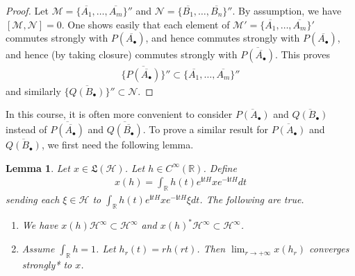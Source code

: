 \documentclass[12pt,b5paper,notitlepage]{article}
\theoremstyle{definition}
\theoremstyle{plain}
\newtheorem{lm}[df]{Lemma}
\newcommand{\fk}{\mathfrak}
\newcommand{\mc}{\mathcal}
\newcommand{\ovl}{\overline}
\newcommand{\im}{\mathbf{i}}
\newcommand{\blt}{\bullet}
\newcommand{\Rbb}{\mathbb R}
\newcommand{\dps}{\displaystyle}
\numberwithin{equation}{section}
\begin{document}

\begin{proof}
Let $\mc M=\{\ovl{A_1},\dots,\ovl{A_m}\}''$ and $\mc N=\{\ovl{B_1},\dots,\ovl{B_n}\}''$. By assumption, we have $[\mc M,\mc N]=0$. One shows easily that each element of $\mc M'=\{\ovl{A_1},\dots,\ovl{A_m}\}'$ commutes strongly with $P(\ovl{A_\blt})$, and hence commutes strongly with $P(\ovl{A_\blt})$, and hence (by taking closure) commutes strongly with $\ovl{P(\ovl{A_\blt})}$. This proves
\begin{align}
\{\ovl{P(\ovl{A_\blt})}\}''\subset\{\ovl{A_1},\dots,\ovl{A_m}\}''
\end{align}
and similarly $\{\ovl{Q(B_\blt)}\}''\subset\mc N$.
\end{proof}


In this course, it is often more convenient to consider $\ovl{P(A_\blt)}$ and $\ovl{Q(B_\blt)}$ instead of $\ovl{P(\ovl{A_\blt})}$ and $\ovl{Q(\ovl{B_\blt})}$. To prove a similar result for $\ovl{P(A_\blt)}$ and $\ovl{Q(B_\blt)}$, we first need the following lemma.



\begin{lm}\label{lb64}
Let $x\in\fk L(\mc H)$. Let $h\in C^\infty(\Rbb)$. Define
\begin{align}
x(h)=\int_\Rbb h(t)e^{\im tH}xe^{-\im tH}dt
\end{align}
sending each $\xi\in\mc H$ to $\int_\Rbb h(t)e^{\im tH}xe^{-\im tH}\xi dt$. The following are true.
\begin{enumerate}
\item We have $x(h)\mc H^\infty\subset\mc H^\infty$ and $x(h)^*\mc H^\infty\subset\mc H^\infty$.
\item Assume  $\int_\Rbb h=1$. Let $h_r(t)=r h(r t)$. Then $\dps\lim_{r\rightarrow+\infty}x(h_r)$ converges strongly* to $x$.
\end{enumerate}
\end{lm}
\end{document}
